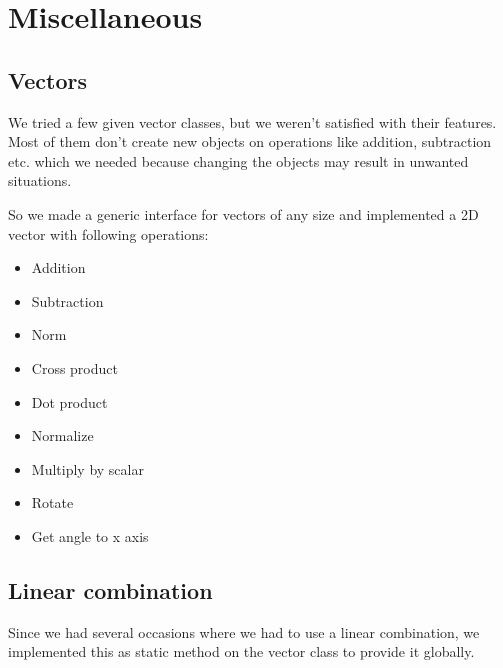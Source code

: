 
\section{Miscellaneous}

\subsection{Vectors}
\label{sec:vectors}

We tried a few given vector classes, but we weren't satisfied
with their features. Most of them don't create new objects
on operations like addition, subtraction etc. which we needed because 
changing the objects may result in unwanted situations. %

\noindent So we made a generic interface for vectors of any size and
implemented a 2D vector with following operations:

\begin{itemize}
\item Addition
\item Subtraction
\item Norm
\item Cross product
\item Dot product
\item Normalize
\item Multiply by scalar
\item Rotate 
\item Get angle to x axis
\end{itemize}

\subsection{Linear combination}
\label{sec:linearCombination}

Since we had several occasions where we had to use a
linear combination, we implemented this as static method
on the vector class to provide it globally.
